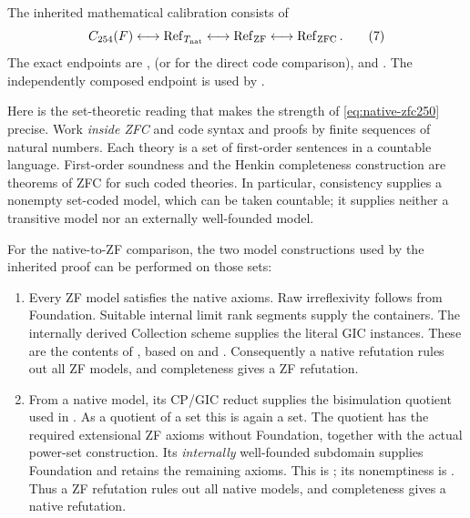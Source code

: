 The inherited mathematical calibration consists of
\[
 C_{254}(F)
 \longleftrightarrow \operatorname{Ref}_{T_{\rm nat}}
 \longleftrightarrow \operatorname{Ref}_{\rm ZF}
 \longleftrightarrow \operatorname{Ref}_{\rm ZFC}.
\tag{7}\label{eq:native-zfc250}
\]
The exact endpoints are
,
 (or
 for the direct code
comparison), and
.
The independently composed endpoint
is used by .

Here is the set-theoretic reading that makes the strength of
\eqref{eq:native-zfc250} precise.  Work \emph{inside ZFC} and code
syntax and proofs by finite sequences of natural numbers.  Each
theory is a set of first-order sentences in a countable language.
First-order soundness and the Henkin completeness construction
are theorems of ZFC for such coded theories.  In particular,
consistency supplies a nonempty set-coded model, which can be
taken countable; it supplies neither a transitive model nor an
externally well-founded model.

For the native-to-ZF comparison, the two model constructions used
by the inherited proof can be performed on those sets:
\begin{enumerate}
\item Every ZF model satisfies the native axioms.  Raw
irreflexivity follows from Foundation.  Suitable internal limit
rank segments supply the containers.  The internally derived
Collection scheme supplies the literal GIC instances.  These
are the contents of , based on
 and .
Consequently a native refutation rules out all ZF models, and
completeness gives a ZF refutation.
\item From a native model, its CP/GIC reduct supplies the
bisimulation quotient used in .  As a
quotient of a set this is again a set.  The quotient has the
required extensional ZF axioms without Foundation, together
with the actual power-set construction.  Its \emph{internally}
well-founded subdomain supplies Foundation and retains the
remaining axioms.  This is
; its nonemptiness is
.
Thus a ZF refutation rules out all native models, and
completeness gives a native refutation.
\end{enumerate}

